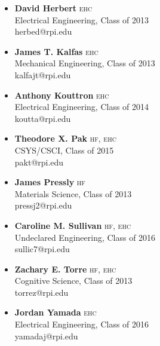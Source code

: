 \documentclass[12pt,draft,oneside]{article}
\begin{document}
\begin{multicols}{2}
  \begin{itemize}[label=\null,labelwidth=0pt,leftmargin=0pt]
    \setlength{\itemsep}{6pt}
    \item %
      \textbf{David Herbert} \textsc{ehc}\\
      Electrical Engineering, Class of 2013\\ herbed@rpi.edu
    \item %
      \textbf{James T. Kalfas} \textsc{ehc}\\
      Mechanical Engineering, Class of 2013\\ kalfajt@rpi.edu
    \item %
      \textbf{Anthony Kouttron} \textsc{ehc}\\
      Electrical Engineering, Class of 2014\\ koutta@rpi.edu
    \item %
      \textbf{Theodore X. Pak} \textsc{hf, ehc}\\
      CSYS/CSCI, Class of 2015\\pakt@rpi.edu
    \item %
      \textbf{James Pressly} \textsc{hf}\\
      Materials Science, Class of 2013\\ pressj2@rpi.edu
    \item %
      \textbf{Caroline M. Sullivan} \textsc{hf, ehc}\\
      Undeclared Engineering, Class of 2016\\ sullic7@rpi.edu
    \item %
      \textbf{Zachary E. Torre} \textsc{hf, ehc}\\
      Cognitive Science, Class of 2013\\ torrez@rpi.edu
    \item %
      \textbf{Jordan Yamada} \textsc{ehc}\\
      Electrical Engineering, Class of 2016\\ yamadaj@rpi.edu
  \end{itemize}
\end{multicols}
\end{document}
